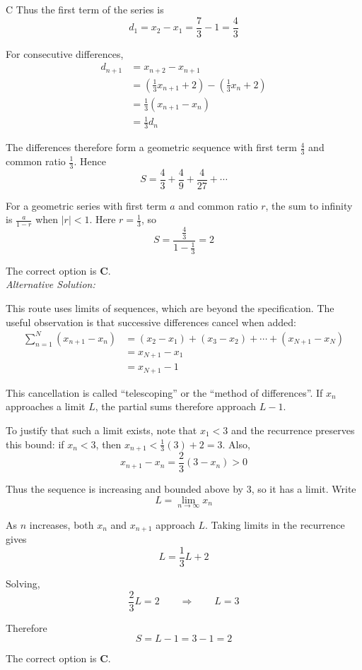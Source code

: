 \documentclass[11pt,a4paper]{article}
\begin{document}
\begin{enumerate}[label=\textbf{\arabic*.},leftmargin=*,itemsep=0pt,start=18]
\begin{djsSolution}{C}
Thus the first term of the series is
\[
d_1=x_2-x_1=\frac73-1=\frac43
\]

For consecutive differences,
\[
\begin{aligned}
d_{n+1}&=x_{n+2}-x_{n+1}\\[5pt]
&=\left(\frac13x_{n+1}+2\right)-\left(\frac13x_n+2\right)\\[5pt]
&=\frac13(x_{n+1}-x_n)\\[5pt]
&=\frac13d_n
\end{aligned}
\]

The differences therefore form a geometric sequence with first term $\frac43$ and common ratio $\frac13$. Hence
\[
S=\frac43+\frac49+\frac4{27}+\cdots
\]

For a geometric series with first term $a$ and common ratio $r$, the sum to infinity is $\frac{a}{1-r}$ when $|r|<1$. Here $r=\frac13$, so
\[
S=\frac{\frac43}{1-\frac13}=2
\]

The correct option is \textbf{C}.\\[5pt]

\textit{Alternative Solution:}

This route uses limits of sequences, which are beyond the specification. The useful observation is that successive differences cancel when added:
\[
\begin{aligned}
\sum_{n=1}^{N}(x_{n+1}-x_n)
&=(x_2-x_1)+(x_3-x_2)+\cdots+(x_{N+1}-x_N)\\[5pt]
&=x_{N+1}-x_1\\[5pt]
&=x_{N+1}-1
\end{aligned}
\]

This cancellation is called ``telescoping'' or the ``method of differences''. If $x_n$ approaches a limit $L$, the partial sums therefore approach $L-1$.

To justify that such a limit exists, note that $x_1<3$ and the recurrence preserves this bound: if $x_n<3$, then $x_{n+1}<\frac13(3)+2=3$. Also,
\[
x_{n+1}-x_n=\frac23(3-x_n)>0
\]

Thus the sequence is increasing and bounded above by $3$, so it has a limit. Write
\[
L=\lim_{n\to\infty}x_n
\]

As $n$ increases, both $x_n$ and $x_{n+1}$ approach $L$. Taking limits in the recurrence gives
\[
L=\frac13L+2
\]

Solving,
\[
\frac23L=2
\qquad\Longrightarrow\qquad
L=3
\]

Therefore
\[
S=L-1=3-1=2
\]

The correct option is \textbf{C}.
\end{djsSolution}
\end{enumerate}
\end{document}
